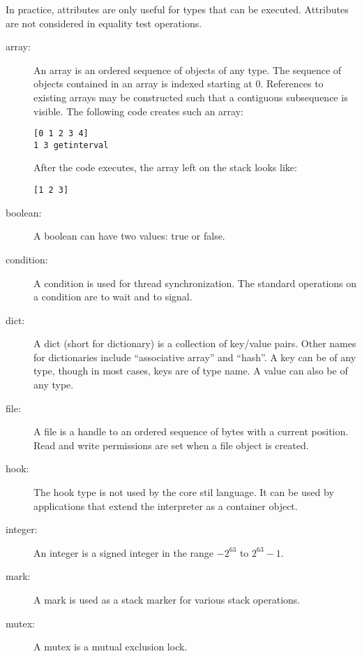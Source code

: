 In practice, attributes are only useful for types that can be executed.
Attributes are not considered in equality test operations.

\begin{description}

\item[array: ] An array is an ordered sequence of objects of any type.  The
sequence of objects contained in an array is indexed starting at 0.  References
to existing arrays may be constructed such that a contiguous subsequence is
visible.  The following code creates such an array:

\begin{verbatim}
[0 1 2 3 4]
1 3 getinterval
\end{verbatim}

After the code executes, the array left on the stack looks like:

\begin{verbatim}
[1 2 3]
\end{verbatim}

\item[boolean: ] A boolean can have two values: true or false.

\item[condition: ] A condition is used for thread synchronization.  The standard
operations on a condition are to wait and to signal.

\item[dict: ] A dict (short for dictionary) is a collection of key/value pairs.
Other names for dictionaries include ``associative array'' and ``hash''.  A key
can be of any type, though in most cases, keys are of type name.  A value can
also be of any type.

\item[file: ] A file is a handle to an ordered sequence of bytes with a current
position.  Read and write permissions are set when a file object is created.

\item[hook: ] The hook type is not used by the core stil language.  It can be
used by applications that extend the interpreter as a container object.

\item[integer: ] An integer is a signed integer in the range $-2^{63}$ to
$2^{63} - 1$.

\item[mark: ] A mark is used as a stack marker for various stack operations.

\item[mutex: ] A mutex is a mutual exclusion lock.


\end{description}
